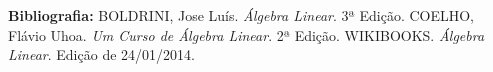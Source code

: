 \documentclass[11pt,a4paper]{article}
\newcommand\taba[1][2.55cm]{\hspace*{#1}}
\begin{document}
\begin{flushleft}
%
%
\textbf{Bibliografia: }BOLDRINI, Jose Luís. \textit{Álgebra Linear}. 3ª Edição. \linebreak
\taba COELHO, Flávio Uhoa. \textit{Um Curso de Álgebra Linear}. 2ª Edição.
\taba WIKIBOOKS. \textit{Álgebra Linear}. Edição de 24/01/2014. \linebreak
\end{flushleft}
\end{document}
